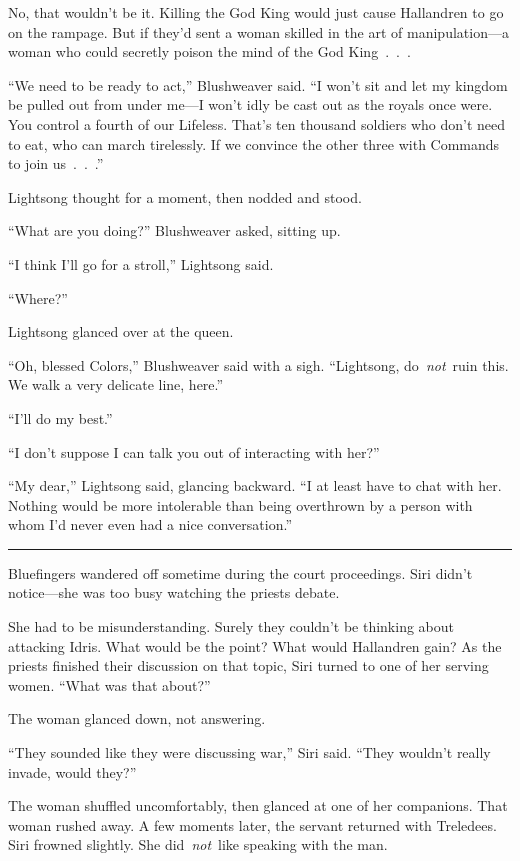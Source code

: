 No, that wouldn’t be it. Killing the God King would just cause Hallandren to go on the rampage. But if they’d sent a woman skilled in the art of manipulation—a woman who could secretly poison the mind of the God King~.~.~.

“We need to be ready to act,” Blushweaver said. “I won’t sit and let my kingdom be pulled out from under me—I won’t idly be cast out as the royals once were. You control a fourth of our Lifeless. That’s ten thousand soldiers who don’t need to eat, who can march tirelessly. If we convince the other three with Commands to join us~.~.~.”

Lightsong thought for a moment, then nodded and stood.

“What are you doing?” Blushweaver asked, sitting up.

“I think I’ll go for a stroll,” Lightsong said.

“Where?”

Lightsong glanced over at the queen.

“Oh, blessed Colors,” Blushweaver said with a sigh. “Lightsong, do~\textit{not}~ruin this. We walk a very delicate line, here.”

“I’ll do my best.”

“I don’t suppose I can talk you out of interacting with her?”

“My dear,” Lightsong said, glancing backward. “I at least have to chat with her. Nothing would be more intolerable than being overthrown by a person with whom I’d never even had a nice conversation.”

\bigskip \hrule \bigskip

Bluefingers wandered off sometime during the court proceedings. Siri didn’t notice—she was too busy watching the priests debate.

She had to be misunderstanding. Surely they couldn’t be thinking about attacking Idris. What would be the point? What would Hallandren gain? As the priests finished their discussion on that topic, Siri turned to one of her serving women. “What was that about?”

The woman glanced down, not answering.

“They sounded like they were discussing war,” Siri said. “They wouldn’t really invade, would they?”

The woman shuffled uncomfortably, then glanced at one of her companions. That woman rushed away. A few moments later, the servant returned with Treledees. Siri frowned slightly. She did~\textit{not}~like speaking with the man.

